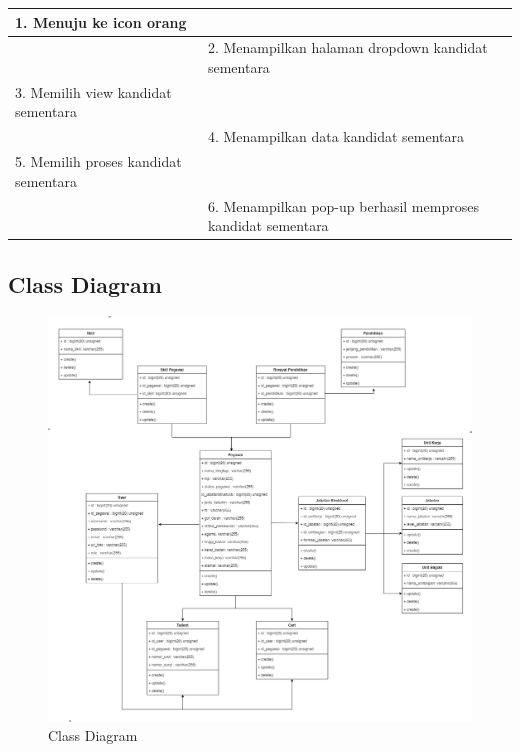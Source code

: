 \begin{enumerate}
\begin{table}
\begin{tabular}{ | l | p{64mm}|}
			1.	Menuju ke icon orang&  \\
			
			\hline
			
			&  2.	Menampilkan halaman  dropdown kandidat sementara \\
			
			\hline
			
			3. Memilih view kandidat sementara & \\
			
			\hline
			
			& 4. Menampilkan data kandidat sementara \\
			\hline
			
			
			5. Memilih proses kandidat sementara &  \\
			\hline
			
			& 6. Menampilkan pop-up berhasil memproses kandidat sementara \\
			\hline
			
	\end{tabular}
\end{table}

\end{enumerate}

\subsection{Class Diagram}

\begin{figure}
	\centering
	\includegraphics[width=1\textwidth]
	{pics/diagram/classdiagram.png}
	\caption{Class Diagram}
	\label{fig:32}
\end{figure}

